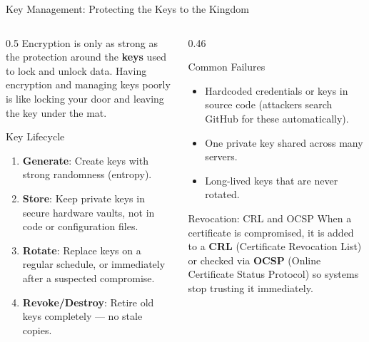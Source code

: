 \documentclass[aspectratio=169]{beamer}  %
\begin{document}
\begin{frame}{Key Management: Protecting the Keys to the Kingdom}
    \begin{columns}[T]
        \begin{column}{0.5\textwidth}
            \footnotesize
            Encryption is only as strong as the protection around the \textbf{keys} used to lock and unlock data. Having encryption and managing keys poorly is like locking your door and leaving the key under the mat.

            \vspace{0.3em}
            \begin{block}{Key Lifecycle}
                \footnotesize
                \begin{enumerate}
                    \item \textbf{Generate}: Create keys with strong randomness (entropy).
                    \item \textbf{Store}: Keep private keys in secure hardware vaults, not in code or configuration files.
                    \item \textbf{Rotate}: Replace keys on a regular schedule, or immediately after a suspected compromise.
                    \item \textbf{Revoke/Destroy}: Retire old keys completely --- no stale copies.
                \end{enumerate}
            \end{block}
        \end{column}
        \begin{column}{0.46\textwidth}
            \begin{alertblock}{Common Failures}
                \footnotesize
                \begin{itemize}
                    \item Hardcoded credentials or keys in source code (attackers search GitHub for these automatically).
                    \item One private key shared across many servers.
                    \item Long-lived keys that are never rotated.
                \end{itemize}
            \end{alertblock}
            \begin{exampleblock}{Revocation: CRL and OCSP}
                \footnotesize
                When a certificate is compromised, it is added to a \textbf{CRL} (Certificate Revocation List) or checked via \textbf{OCSP} (Online Certificate Status Protocol) so systems stop trusting it immediately.
            \end{exampleblock}
        \end{column}
    \end{columns}
\end{frame}
\end{document}
